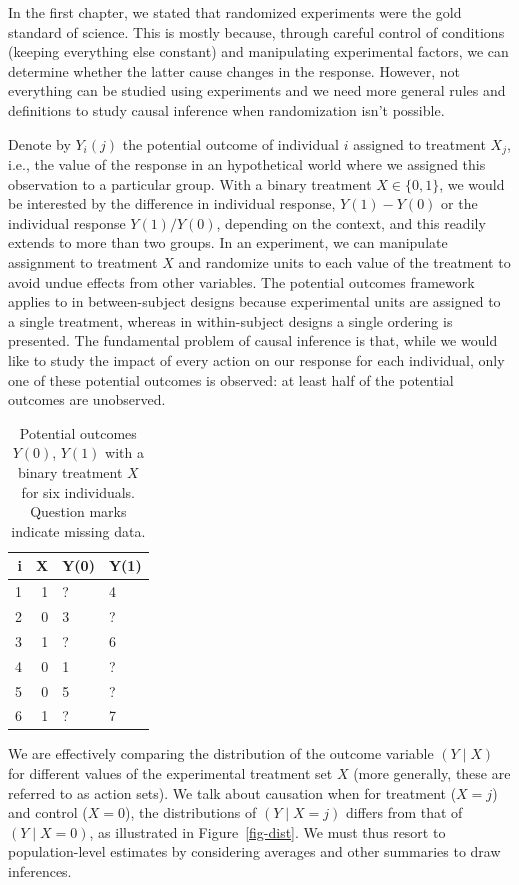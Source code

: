 \documentclass[
  11pt,
  letterpaper,
]{scrbook}
\theoremstyle{definition}
\theoremstyle{remark}
\begin{document}
In the first chapter, we stated that randomized experiments were the
gold standard of science. This is mostly because, through careful
control of conditions (keeping everything else constant) and
manipulating experimental factors, we can determine whether the latter
cause changes in the response. However, not everything can be studied
using experiments and we need more general rules and definitions to
study causal inference when randomization isn't possible.

Denote by \(Y_i(j)\) the potential outcome of individual \(i\) assigned
to treatment \(X_j\), i.e., the value of the response in an hypothetical
world where we assigned this observation to a particular group. With a
binary treatment \(X \in \{0,1\}\), we would be interested by the
difference in individual response, \(Y(1)-Y(0)\) or the individual
response \(Y(1)/Y(0)\), depending on the context, and this readily
extends to more than two groups. In an experiment, we can manipulate
assignment to treatment \(X\) and randomize units to each value of the
treatment to avoid undue effects from other variables. The potential
outcomes framework applies to in between-subject designs because
experimental units are assigned to a single treatment, whereas in
within-subject designs a single ordering is presented. The fundamental
problem of causal inference is that, while we would like to study the
impact of every action on our response for each individual, only one of
these potential outcomes is observed: at least half of the potential
outcomes are unobserved.

\hypertarget{tbl-missing}{}
\begin{table}
\caption{\label{tbl-missing}Potential outcomes \(Y(0)\), \(Y(1)\) with a binary treatment \(X\) for
six individuals. Question marks indicate missing data. }\tabularnewline

\centering
\begin{tabular}{rrll}
\toprule
i & X & Y(0) & Y(1)\\
\midrule
1 & 1 & ? & 4\\
2 & 0 & 3 & ?\\
3 & 1 & ? & 6\\
4 & 0 & 1 & ?\\
5 & 0 & 5 & ?\\
6 & 1 & ? & 7\\
\bottomrule
\end{tabular}
\end{table}

We are effectively comparing the distribution of the outcome variable
\((Y \mid X)\) for different values of the experimental treatment set
\(X\) (more generally, these are referred to as action sets). We talk
about causation when for treatment (\(X=j\)) and control (\(X=0\)), the
distributions of \((Y \mid X=j)\) differs from that of \((Y \mid X=0)\),
as illustrated in Figure~\ref{fig-dist}. We must thus resort to
population-level estimates by considering averages and other summaries
to draw inferences.
\end{document}
